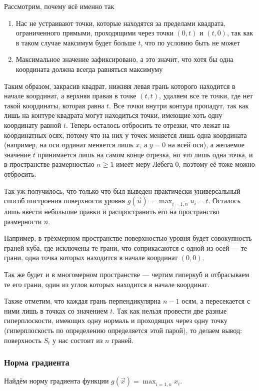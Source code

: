 Рассмотрим, почему всё именно так
\begin{enumerate}
    \item Нас не устраивают точки, которые находятся за пределами
        квадрата, ограниченного прямыми, проходящими через точки
        $\left( 0, t \right)$ и $\left( t, 0 \right)$,
        так как в таком случае максимум будет больше $t$,
        что по условию быть не может
    \item Максимальное значение зафиксировано, а это значит,
        что хотя бы одна координата должна
        всегда равняться максимуму
\end{enumerate}

Таким образом, закрасив квадрат, нижняя левая грань которого
находится в начале координат, а верхняя правая в точке $\left( t, t \right)$,
удаляем все те точки, где нет такой координаты, которая равна $t$.
Все точки внутри контура пропадут, так как лишь на контуре квадрата
могут находиться точки, имеющие хоть одну координату равной $t$.
Теперь осталось отбросить те отрезки, что лежат на координатных осях,
потому что на них у точек меняется лишь одна координата
(например, на оси ординат меняется лишь $x$, а $y=0$ на всей оси),
а желаемое значение $t$ принимается лишь на самом конце отрезка,
но это лишь одна точка, и в пространстве размерностью $n \ge 1$
имеет меру Лебега $0$, поэтому её тоже можно отбросить.

Так уж получилось, что только что был выведен
практически универсальный способ построения поверхности уровня
$g\left( \vec{u} \right) = \max_{i=\overline{1,n}} u_i = t$.
Осталось лишь ввести небольшие правки и распространить его на
пространство размерности $n$.

Например, в трёхмерном пространстве поверхностью уровня будет
совокупность граней куба, где исключены те грани,
что соприкасаются с одной из осей --- те грани, одна точка которых
находится в начале координат $\left( 0, 0 \right)$.

Так же будет и в многомерном пространстве --- чертим гиперкуб
и отбрасываем те его грани, один из углов которых находится в начале координат.

Также отметим, что каждая грань перпендикулярна $n-1$ осям,
а пересекается с ними лишь в точках со значением $t$.
Так как нельзя провести две разные гиперплоскости, имеющих одну нормаль
и проходящих через одну точку (гиперплоскость по определению
определяется этой парой), то делаем вывод:
поверхность $S_t$ у нас состоит из $n$ граней.

\subsubsection{Норма градиента}
Найдём норму градиента функции
$g\left( \vec{x} \right) = \max_{i=\overline{1,n}} x_i$.

